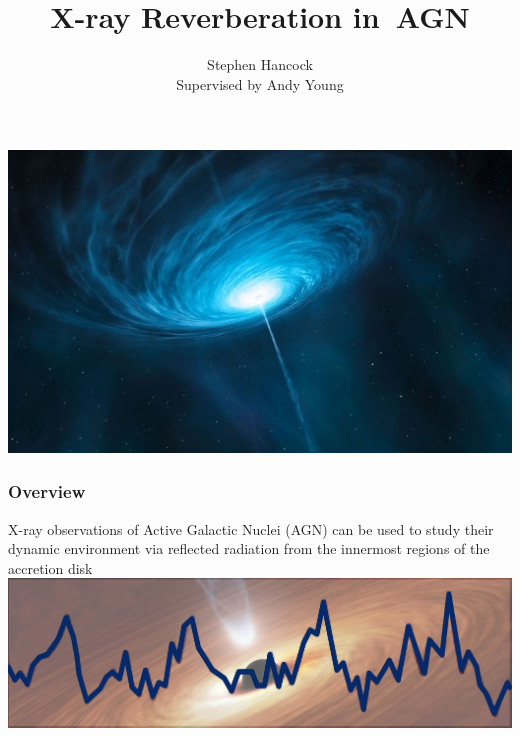 \documentclass[]{beamer}
\title{X-ray Reverberation in~AGN}
\author[Stephen Hancock]{Stephen Hancock \\Supervised by Andy Young}
\begin{document}
\begin{frame}
\includegraphics[width=\textwidth,height=.45\textheight]{bh2.jpg}
\titlepage
\end{frame}

\begin{frame}
\frametitle{Overview}
\centering
X-ray observations of Active Galactic Nuclei (AGN) can be used to study their dynamic environment via reflected radiation from the innermost regions of the accretion disk
\includegraphics[width=\textwidth,height=.45\textheight]{agn2.jpg}

\end{frame}
\end{document}
